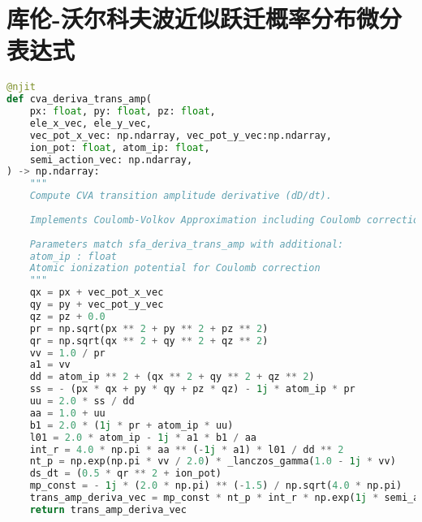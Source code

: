 \section{库伦-沃尔科夫波近似跃迁概率分布微分表达式}\label{app:cva_trans_amp}
\begin{lstlisting}[language=Python, caption={CVA跃迁概率分布微分表达式}, label={code:cva-trans-amp}]
@njit
def cva_deriva_trans_amp(
	px: float, py: float, pz: float,
	ele_x_vec, ele_y_vec,
	vec_pot_x_vec: np.ndarray, vec_pot_y_vec:np.ndarray,
	ion_pot: float, atom_ip: float,
	semi_action_vec: np.ndarray,
) -> np.ndarray:
    """
	Compute CVA transition amplitude derivative (dD/dt).
	
	Implements Coulomb-Volkov Approximation including Coulomb corrections.
	
	Parameters match sfa_deriva_trans_amp with additional:
	atom_ip : float
	Atomic ionization potential for Coulomb correction
	"""
	qx = px + vec_pot_x_vec
	qy = py + vec_pot_y_vec
	qz = pz + 0.0
	pr = np.sqrt(px ** 2 + py ** 2 + pz ** 2)
	qr = np.sqrt(qx ** 2 + qy ** 2 + qz ** 2)
	vv = 1.0 / pr
	a1 = vv
	dd = atom_ip ** 2 + (qx ** 2 + qy ** 2 + qz ** 2)
	ss = - (px * qx + py * qy + pz * qz) - 1j * atom_ip * pr
	uu = 2.0 * ss / dd
	aa = 1.0 + uu
	b1 = 2.0 * (1j * pr + atom_ip * uu)
	l01 = 2.0 * atom_ip - 1j * a1 * b1 / aa
	int_r = 4.0 * np.pi * aa ** (-1j * a1) * l01 / dd ** 2
	nt_p = np.exp(np.pi * vv / 2.0) * _lanczos_gamma(1.0 - 1j * vv)
	ds_dt = (0.5 * qr ** 2 + ion_pot)
	mp_const = - 1j * (2.0 * np.pi) ** (-1.5) / np.sqrt(4.0 * np.pi)
	trans_amp_deriva_vec = mp_const * nt_p * int_r * np.exp(1j * semi_action_vec) * ds_dt
	return trans_amp_deriva_vec
\end{lstlisting}

